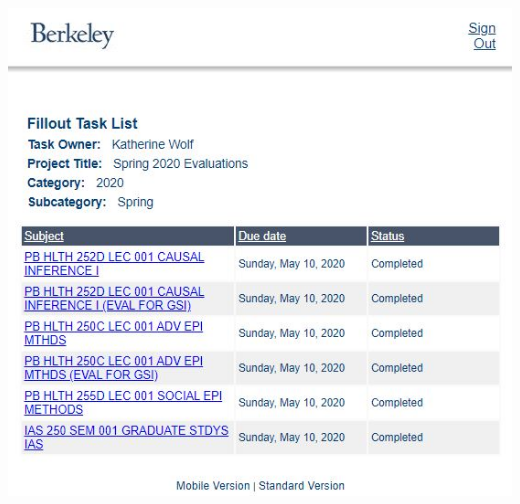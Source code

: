 \documentclass[
  11pt,
]{article}
\begin{document}
\includegraphics{course_evaluation.jpg}
\end{document}
